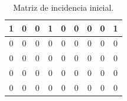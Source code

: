 \renewcommand{\arraystretch}{1.5}
\setlength{\tabcolsep}{10pt}

\begin{table}[H]
    \centering
    \begin{tabular}{|c|c|c|c|c|c|c|c|c|}
        \hline
        1 & 0 & 0 & 1 & 0 & 0 & 0 & 0 & 1 \\
        \hline
        0 & 0 & 0 & 0 & 0 & 0 & 0 & 0 & 0 \\
        \hline
        0 & 0 & 0 & 0 & 0 & 0 & 0 & 0 & 0 \\
        \hline
        0 & 0 & 0 & 0 & 0 & 0 & 0 & 0 & 0 \\
        \hline
        0 & 0 & 0 & 0 & 0 & 0 & 0 & 0 & 0 \\
        \hline
    \end{tabular}
    \caption{Matriz de incidencia inicial.}
    \label{tabla:matriz_incidencia_pre}
\end{table}

